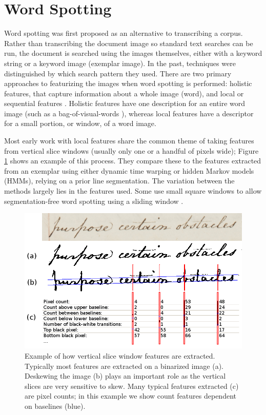 \documentclass[ms,electronic,twosidetoc,letterpaper,chaptercenter,parttop,lof,lot]{byumsphd}
\begin{document}
\section{Word Spotting}\label{relatedwork_wordspotting}


Word spotting was first proposed as an alternative to transcribing a corpus. Rather than transcribing the document image so standard text searches can be run, the document is searched using the images themselves, either with a keyword string or a keyword image (exemplar image). In the past, techniques were distinguished by which search pattern they used. There are two primary approaches to featurizing the images when word spotting is performed: holistic features, that capture information about a whole image (word), and local or sequential features \cite{Rodrıguez2008}. Holistic features have one description for an entire word image (such as a bag-of-visual-words \cite{Shekhar2012}), whereas local features have a descriptor for a small portion, or window, of a word image. 

Most early work with local features share the common theme of taking features from vertical slice windows (usually only one or a handful of pixels wide); Figure \ref{fig:vertslice} shows an example of this process. They compare these to the features extracted from an exemplar using either dynamic time warping or hidden Markov models (HMMs), relying on a prior line segmentation. The variation between the methods largely lies in the features used. Some use small square windows to allow segmentation-free word spotting using a sliding window \cite{Rothacker2013}.

\begin{figure}[t]
    \centering
    \includegraphics[width=.99\textwidth]{vertwind}
    \caption{Example of how vertical slice window features are extracted. Typically most features are extracted on a binarized image (a). Deskewing the image (b) plays an important role as the vertical slices are very sensitive to skew. Many typical features extracted (c) are pixel counts; in this example we show count features dependent on baselines (blue).}
    \label{fig:vertslice}
\end{figure}
\end{document}
